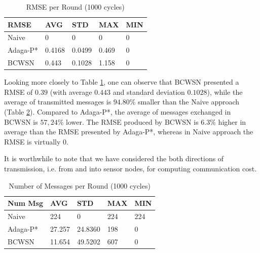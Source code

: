 \documentclass{acm_proc_article-sp}
\begin{document}
\begin{table}[h!]
\caption{RMSE per Round (1000 cycles)}
\label{tab:rmse}
\begin{center}
\begin{tabular}{|l||l|l|l|l|}
\hline
RMSE &AVG &STD &MAX &MIN \\
\hline\hline
Naive &0 &0 &0 &0 \\
\hline
Adaga-P* &0.4168 &0.0499 &0.469 &0 \\
\hline
BCWSN &0.443 &0.1028 &1.158 &0 \\
\hline
\end{tabular}
\end{center}
\end{table}


Looking more closely to Table \ref{tab:rmse}, one can observe that BCWSN
presented a RMSE of $0.39$ (with average $0.443$ and standard deviation $0.1028$),
while the average of transmitted messages is $94.80\%$ smaller than the Naive
approach (Table \ref{tab:num-msg}). Compared to Adaga-P*, the average of
messages exchanged in BCWSN is $57,24\%$ lower. The RMSE produced by BCWSN is
$6.3\%$ higher in average than the RMSE presented by Adaga-P*, whereas
in Naive approach the RMSE is virtually $0$.

It is worthwhile to note that we have considered the both directions of
transmission, i.e. from and into sensor nodes, for computing communication cost.



\begin{table}[h!]
\caption{Number of Messages per Round (1000 cycles)}
\label{tab:num-msg}
\begin{center}
\begin{tabular}{|l||l|l|l|l|}
\hline
Num Msg &AVG &STD &MAX &MIN \\
\hline\hline
Naive &224 &0 &224 &224 \\
\hline
Adaga-P* &27.257 &24.8360 &198 &0 \\
\hline
BCWSN &11.654 &49.5202 &607 &0 \\
\hline
\end{tabular}
\end{center}
\end{table}
\end{document}
